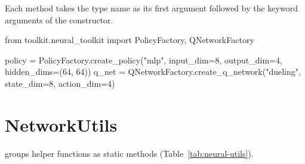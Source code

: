 Each method takes the type name as its first argument followed by the keyword
arguments of the constructor.

\begin{pycode}
from toolkit.neural_toolkit import PolicyFactory, QNetworkFactory

policy = PolicyFactory.create_policy("mlp", input_dim=8, output_dim=4,
                                    hidden_dims=(64, 64))
q_net = QNetworkFactory.create_q_network("dueling", state_dim=8, action_dim=4)
\end{pycode}

\section{NetworkUtils}\label{sec:neural-utils}

 groups helper functions as static methods
(Table~\ref{tab:neural-utils}).

